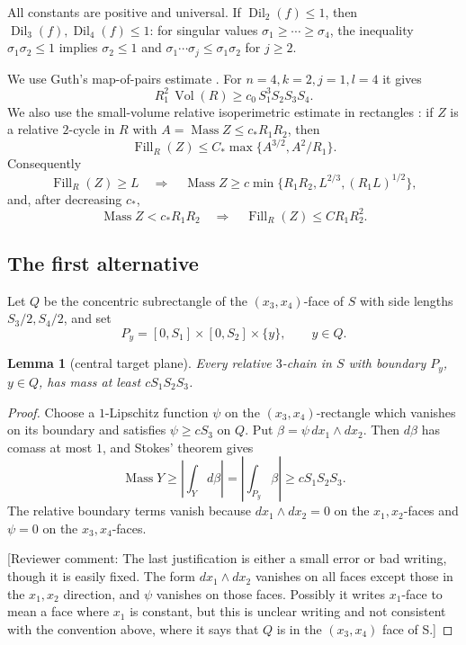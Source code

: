 \documentclass[12pt]{article}
\newtheorem{lemma}{Lemma}
\newcommand{\Dil}{\operatorname{Dil}}
\newcommand{\Vol}{\operatorname{Vol}}
\newcommand{\Mass}{\operatorname{Mass}}
\newcommand{\Fill}{\operatorname{Fill}}
\begin{document}
All constants are positive and universal.  If \(\Dil_2(f)\le1\), then
\(\Dil_3(f),\Dil_4(f)\le1\): for singular values
\(\sigma_1\ge\cdots\ge\sigma_4\), the inequality
\(\sigma_1\sigma_2\le1\) implies \(\sigma_2\le1\) and
\(\sigma_1\cdots\sigma_j\le\sigma_1\sigma_2\) for \(j\ge2\).

We use Guth's map-of-pairs estimate \cite[Estimate 1]{GuthExpanding}.  For
\(n=4,k=2,j=1,l=4\) it gives
\begin{equation}\label{guth14}
        R_1^2\,\Vol(R)\ge c_0\,S_1^3S_2S_3S_4 .
\end{equation}
We also use the small-volume relative isoperimetric estimate in rectangles
\cite[Theorem 3]{GuthExpanding}: if \(Z\) is a relative \(2\)-cycle in \(R\)
with \(A=\Mass Z\le c_*R_1R_2\), then
\[
        \Fill_R(Z)\le C_*\max\{A^{3/2},A^2/R_1\}.
\]
Consequently
\begin{equation}\label{profile-inverse}
\Fill_R(Z)\ge L\quad\Longrightarrow\quad
\Mass Z\ge c\min\{R_1R_2,L^{2/3},(R_1L)^{1/2}\},
\end{equation}
and, after decreasing \(c_*\),
\begin{equation}\label{iso}
        \Mass Z<c_*R_1R_2\quad\Longrightarrow\quad
        \Fill_R(Z)\le C R_1R_2^2 .
\end{equation}

\subsection*{The first alternative}

Let \(Q\) be the concentric subrectangle of the \((x_3,x_4)\)-face of \(S\)
with side lengths \(S_3/2,S_4/2\), and set
\[
        P_y=[0,S_1]\times[0,S_2]\times\{y\},\qquad y\in Q.
\]

\begin{lemma}[central target plane]\label{central}
Every relative \(3\)-chain in \(S\) with boundary \(P_y\), \(y\in Q\), has
mass at least \(cS_1S_2S_3\).
\end{lemma}

\begin{proof}
Choose a \(1\)-Lipschitz function \(\psi\) on the
\((x_3,x_4)\)-rectangle which vanishes on its boundary and satisfies
\(\psi\ge cS_3\) on \(Q\).  Put \(\beta=\psi\,dx_1\wedge dx_2\).  Then
\(d\beta\) has comass at most \(1\), and Stokes' theorem gives
\[
\Mass Y\ge\left|\int_Yd\beta\right|
 =\left|\int_{P_y}\beta\right|\ge cS_1S_2S_3 .
\]
The relative boundary terms vanish because \(dx_1\wedge dx_2=0\) on the
\(x_1,x_2\)-faces and \(\psi=0\) on the \(x_3,x_4\)-faces.

[Reviewer comment: The last justification is either a small error or bad writing, though it is easily fixed.  The form \(dx_1 \wedge dx_2\) vanishes on all faces except those in the \(x_1, x_2\) direction, and \(\psi\) vanishes on those faces.  Possibly it writes $x_1$-face to mean a face where $x_1$ is constant, but this is unclear writing and not consistent with the convention above, where it says that $Q$ is in the \((x_3,x_4)\) face of S.]
\end{proof}
\end{document}
